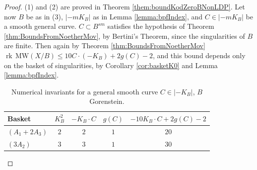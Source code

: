 \documentclass[11pt]{amsart}
\theoremstyle{definition}
\theoremstyle{definition}
\theoremstyle{remark}
\theoremstyle{remark}
\theoremstyle{definition}
\theoremstyle{conjecture}
\newcommand{\MW}{\mathrm{MW}}
\begin{document}
\begin{proof} 

(1) and (2) are proved in Theorem \ref{them:boundKodZeroBNonLDP}.   Let now $B$ be as in (3),  $|-mK_B|$  as in Lemma \ref{lemma:bpfIndex},  and $C\in |-mK_B|$ be a smooth general curve.   $C \subset B^{sm}$ satisfies the hypothesis of Theorem \ref{thm:BoundsFromNoetherMov}, by Bertini's Theorem, since the singularities of $B$ are finite.
 Then again by Theorem \ref{thm:BoundsFromNoetherMov} $ \operatorname{rk}\,\MW(X/B) \leq 10 C  \cdot (- K_B) +2 g(C) -2$,  and  this bound  depends only on the  basket of singularities,   by Corollary \ref{cor:basketK0} and Lemma \ref{lemma:bpfIndex}. 


\begin{table}[ht]
\caption{\scriptsize  Numerical invariants for a general smooth curve $C\in |-K_B|$, $B$ Gorenstein.}
\label{tab:gorenstein-delpezzo}
\centering
\small
\renewcommand{\arraystretch}{1.3}
\begin{tabular}{|l|c|c|c|c|}
\hline
\textbf{Basket} & \textbf{$K_B^2$} & \textbf{$-K_B\cdot C$} & \textbf{$g(C)$} & \textbf{$-10K_B\cdot C+2g(C)-2$} \\
\hline
$(A_1+2A_3)$ & $2$ & $2$ & $1$ & $20$ \\
\hline
$(3A_2)$ & $3$ & $3$ & $1$ & $30$ \\
\hline
\end{tabular}
\end{table}




\end{proof}
\end{document}
